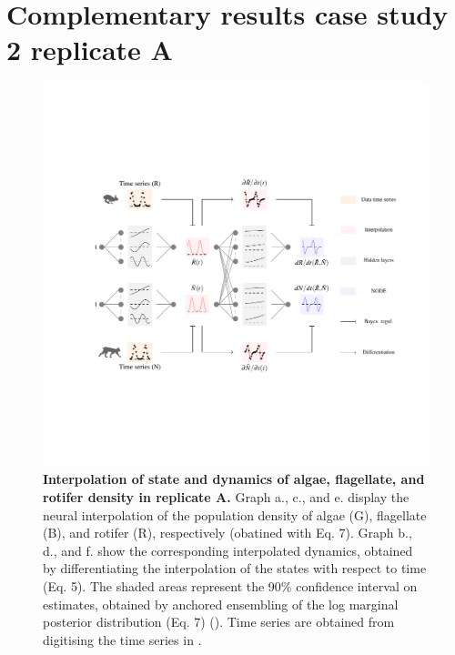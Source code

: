 \documentclass[11pt, oneside]{article}
\begin{document}
\newpage
\section{Complementary results case study 2 replicate A}

\begin{figure}[H]
\includegraphics[width=1\linewidth,page=7]{figures/main.pdf}
\caption{
    \textbf{Interpolation of state and dynamics of algae, flagellate, and rotifer density in replicate A.}
    Graph a., c., and e. display the neural interpolation of the population density of algae (G), flagellate (B), and rotifer (R), respectively (obatined with Eq. 7). 
    Graph b., d., and f. show the corresponding interpolated dynamics, obtained by differentiating the interpolation of the states with respect to time (Eq. 5).
    The shaded areas represent the 90\% confidence interval on estimates, obtained by anchored ensembling of the log marginal posterior distribution (Eq. 7) (\cite{Pearce2018}).
    Time series are obtained from digitising the time series in \cite{Hiltunen2013}.
}
\end{figure}
\newpage
\end{document}
